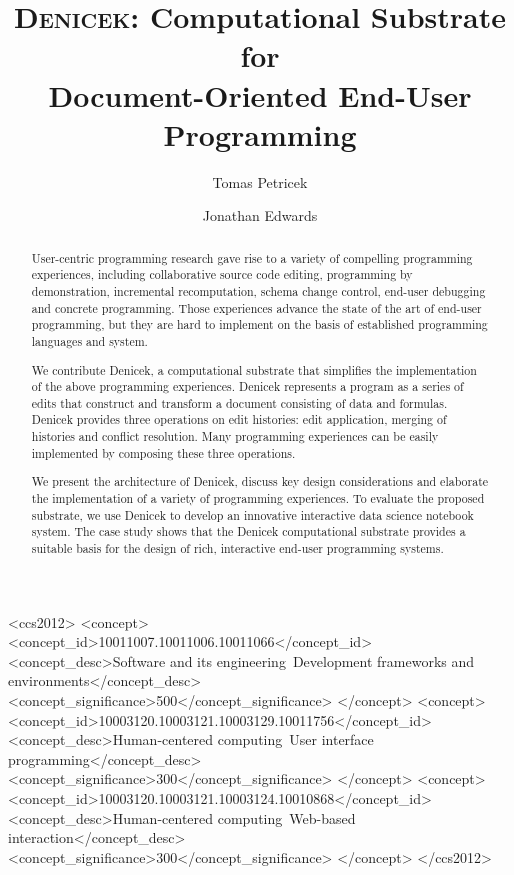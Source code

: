 \documentclass[sigconf]{acmart}
\newcommand{\note}[1]{}
\begin{document}
\title[Denicek: Computational Substrate for Document-Oriented End-User
  Programming]{{\scshape Denicek}: Computational Substrate for\\ Document-Oriented End-User Programming}

\author{Tomas Petricek}

\author{Jonathan Edwards}

\begin{abstract}
\note{Added overview figure with examples showing relationships between Denicek \& co.}
User-centric programming research gave rise to a variety of compelling programming experiences,
including collaborative source code editing, programming by demonstration, incremental
recomputation, schema change control, end-user debugging and concrete programming.
Those experiences advance the state of the art of end-user programming, but they are hard to
implement on the basis of established programming languages and system.\enlargethispage{12pt}

We contribute Denicek, a computational substrate that simplifies the implementation of the
above programming experiences. Denicek represents a program as a series of edits
that construct and transform a document consisting of data and formulas. Denicek provides three
operations on edit histories: edit application, merging of histories and conflict resolution.
Many programming experiences can be easily implemented by composing these three operations.

We present the architecture of Denicek, discuss key design considerations and elaborate
the implementation of a variety of programming experiences. To evaluate the proposed
substrate, we use Denicek to develop an innovative interactive data science notebook system.
The case study shows that the Denicek computational substrate provides a suitable basis for
the design of rich, interactive end-user programming systems.
\end{abstract}

\begin{CCSXML}
 <ccs2012>
    <concept>
        <concept_id>10011007.10011006.10011066</concept_id>
        <concept_desc>Software and its engineering~Development frameworks and environments</concept_desc>
        <concept_significance>500</concept_significance>
        </concept>
    <concept>
        <concept_id>10003120.10003121.10003129.10011756</concept_id>
        <concept_desc>Human-centered computing~User interface programming</concept_desc>
        <concept_significance>300</concept_significance>
        </concept>
    <concept>
        <concept_id>10003120.10003121.10003124.10010868</concept_id>
        <concept_desc>Human-centered computing~Web-based interaction</concept_desc>
        <concept_significance>300</concept_significance>
        </concept>
  </ccs2012>
\end{CCSXML}
\end{document}
